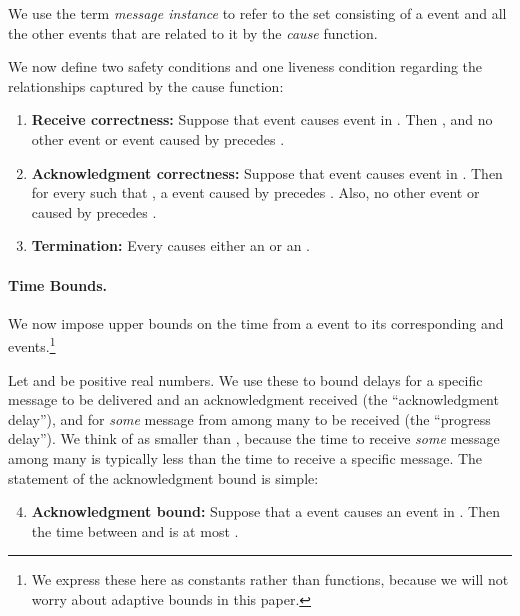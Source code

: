 We use the term \emph{message instance} to refer to the set
consisting of a  event and all the other events that are
related to it by the \emph{cause} function.


We now define two safety conditions and one liveness condition
regarding the relationships captured by the cause function:

\begin{enumerate}
\item {\bf Receive correctness:}
Suppose that  event  causes  event 
in .
Then , and no other  event or  event
caused by  precedes .

\item  {\bf Acknowledgment correctness:}
Suppose that  event  causes  event  in .
Then for every  such that , a  event caused
by  precedes .
Also, no other  event or  caused by 
precedes .

\item  {\bf Termination:}
Every  causes either an  or an .
\end{enumerate}

\paragraph{Time Bounds.}
We now impose upper bounds on the time from a  event to
its corresponding  and  events.\footnote{
  We express these here as constants rather than functions, because we
  will not worry about adaptive bounds in this paper.
  }

Let  and  be positive real numbers.
We use these to bound delays for a specific message to be delivered
and an acknowledgment received (the ``acknowledgment delay''), and for
{\em some} message from among many to be received (the ``progress
delay'').
We think of  as smaller than , because the time to
receive {\em some} message among many is typically less than the time
to receive a specific message.
The statement of the acknowledgment bound is simple:

\begin{enumerate}
\setcounter{enumi}{3}
\item
{\bf Acknowledgment bound:}
Suppose that a  event  causes an  event
 in .
Then the time between  and  is at most .
\end{enumerate}

